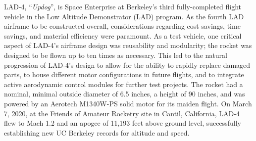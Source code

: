 LAD-4, ``\textit{Updog}'', is Space Enterprise at Berkeley's third fully-completed flight vehicle in the Low Altitude Demonstrator (LAD) program. As the fourth LAD airframe to be constructed overall, considerations regarding cost savings, time savings, and material efficiency were paramount. As a test vehicle, one critical aspect of LAD-4's airframe design was reusability and modularity; the rocket was designed to be flown up to ten times as necessary.  This led to the natural progression of LAD-4's design to allow for the ability to rapidly replace damaged parts, to house different motor configurations in future flights, and to integrate active aerodynamic control modules for further test projects. The rocket had a nominal, minimal outside diameter of 6.5 inches, a height of 90 inches, and was powered by an Aerotech M1340W-PS solid motor for its maiden flight. On March 7, 2020, at the Friends of Amateur Rocketry site in Cantil, California, LAD-4 flew to Mach 1.2 and an apogee of 11,193 feet above ground level, successfully establishing new UC Berkeley records for altitude and speed.  